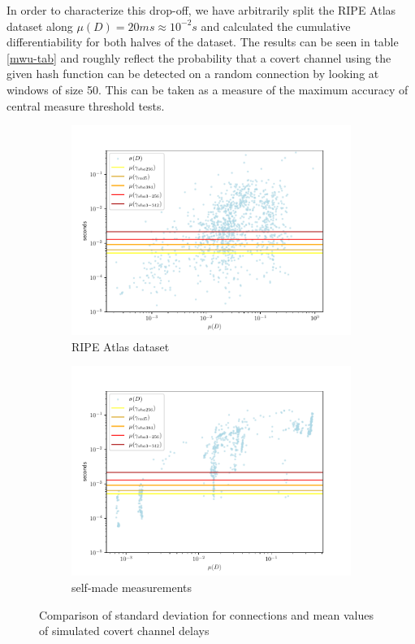 \documentclass[12pt,a4paper,automark, toc=bib]{scrreprt}
\theoremstyle{definition}
\begin{document}
			In order to characterize this drop-off, we have arbitrarily split the RIPE Atlas dataset along $\mu(D)=20ms \approx 10^{-2} s$ and calculated the cumulative differentiability for both halves of the dataset. The results can be seen in table \ref{mwu-tab} and roughly reflect the probability that a covert channel using the given hash function can be detected on a random connection by looking at windows of size 50. This can be taken as a measure of the maximum accuracy of central measure threshold tests. \\
			\begin{figure}
				\centering
				\begin{subfigure}{0.48\linewidth}
					\includegraphics[width=\linewidth]{figures/stat_md5_0std_diff.pdf}
					\caption{RIPE Atlas dataset}
				\end{subfigure}
				\begin{subfigure}{0.48\linewidth}
					\includegraphics[width=\linewidth]{figures/stat_md5_00all_std_diff.pdf}
					\caption{self-made measurements}
				\end{subfigure}
				\caption{Comparison of standard deviation for connections and mean values of simulated covert channel delays}
				\label{mean-fig}
			\end{figure}
\end{document}
